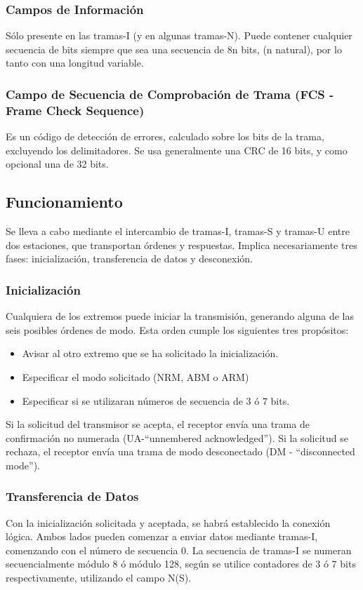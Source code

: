 \documentclass[withindex,glossary]{cam-thesis}
\begin{document}
\subsubsection{Campos de Información}
Sólo presente en las tramas-I (y en algunas tramas-N). Puede contener cualquier secuencia de bits siempre que sea una secuencia de 8n bits, (n natural), por lo tanto con una longitud variable.

\subsubsection{Campo de Secuencia de Comprobación de Trama (FCS - Frame Check Sequence)}
Es un código de detección de errores, calculado sobre los bits de la trama, excluyendo los delimitadores. Se usa generalmente una \gls{CRC} de 16 bits, y como opcional una de 32 bits.

\subsection{Funcionamiento}
Se lleva a cabo mediante el intercambio de tramas-I, tramas-S y tramas-U entre dos estaciones, que transportan órdenes y respuestas. Implica necesariamente tres fases: inicialización, transferencia de datos y desconexión.

\subsubsection{Inicialización}
Cualquiera de los extremos puede iniciar la transmisión, generando alguna de las seis posibles órdenes de modo. Esta orden cumple los siguientes tres propósitos:
\begin{itemize}
	\item Avisar al otro extremo que se ha solicitado la inicialización.
    \item Especificar el modo solicitado (NRM, ABM o ARM)
    \item Especificar si se utilizaran números de secuencia de 3 ó 7 bits.
\end{itemize}
Si la solicitud del transmisor se acepta, el receptor envía una trama de confirmación no numerada (UA-“unnembered acknowledged”). Si la solicitud se rechaza, el receptor envía una trama de modo desconectado (DM - “disconnected mode”).

\subsubsection{Transferencia de Datos}
Con la inicialización solicitada y aceptada, se habrá establecido la conexión lógica. Ambos lados pueden comenzar a enviar datos mediante tramas-I, comenzando con el número de secuencia 0. La secuencia de tramas-I se numeran secuencialmente módulo 8 ó módulo 128, según se utilice contadores de 3 ó 7 bits respectivamente, utilizando el campo N(S).
\end{document}
